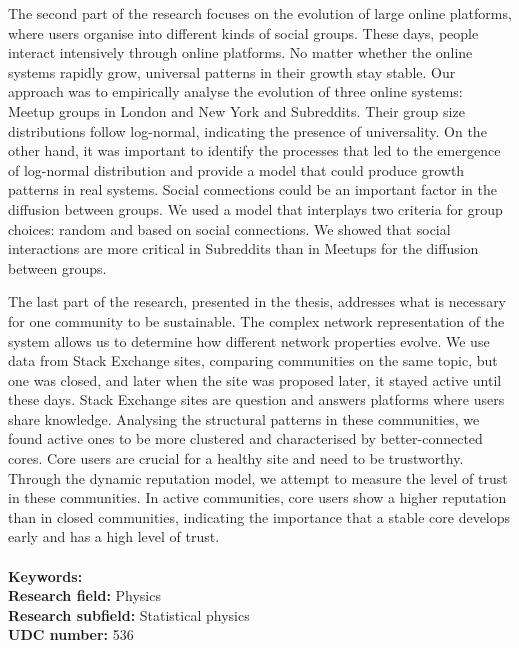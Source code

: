 The second part of the research focuses on the evolution of large online platforms, where users organise into different kinds of social groups. These days, people interact intensively through online platforms. No matter whether the online systems rapidly grow, universal patterns in their growth stay stable. Our approach was to empirically analyse the evolution of three online systems: Meetup groups in London and New York and Subreddits. Their group size distributions follow log-normal, indicating the presence of universality.
On the other hand, it was important to identify the processes that led to the emergence of log-normal distribution and provide a model that could produce growth patterns in real systems. Social connections could be an important factor in the diffusion between groups. We used a model that interplays two criteria for group choices: random and based on social connections. We showed that social interactions are more critical in Subreddits than in Meetups for the diffusion between groups. 

The last part of the research, presented in the thesis, addresses what is necessary for one community to be sustainable. The complex network representation of the system allows us to determine how different network properties evolve. We use data from Stack Exchange sites, comparing communities on the same topic, but one was closed, and later when the site was proposed later, it stayed active until these days. Stack Exchange sites are question and answers platforms where users share knowledge. Analysing the structural patterns in these communities, we found active ones to be more clustered and characterised by better-connected cores. Core users are crucial for a healthy site and need to be trustworthy. Through the dynamic reputation model, we attempt to measure the level of trust in these communities. In active communities, core users show a higher reputation than in closed communities, indicating the importance that a stable core develops early and has a high level of trust. \\~\\
{\textbf {Keywords:}} \\ %
{\textbf {Research field:}} Physics \\
{\textbf {Research subfield:}} Statistical physics\\
\textbf{UDC number:} 536 %

\hfill

\justify
